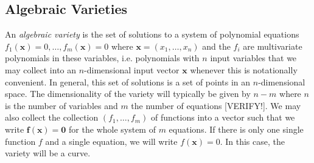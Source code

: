 \subsection{Algebraic Varieties}  %
An \emph{algebraic variety} is the set of solutions to a system of polynomial equations $f_1(\mathbf{x}) = 0, \ldots, f_m(\mathbf{x}) = 0$ where $\mathbf{x} = (x_1, \ldots, x_n)$ and the $f_i$ are multivariate polynomials in these variables, i.e. polynomials with $n$ input variables that we may collect into an $n$-dimensional input vector $\mathbf{x}$ whenever this is notationally convenient. In general, this set of solutions is a set of points in an $n$-dimensional space. The dimensionality of the variety will typically be given by $n-m$ where $n$ is the number of variables and $m$ the number of equations [VERIFY!]. We may also collect the collection $(f_1, \ldots , f_m)$ of functions into a vector such that we write $\mathbf{f(x) = 0}$ for the whole system of $m$ equations. If there is only one single function $f$ and a single equation, we will write $f(\mathbf{x}) = 0$. In this case, the variety will be a curve. 




